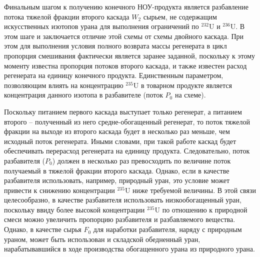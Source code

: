 Финальным шагом к получению конечного НОУ-продукта является разбавление потока тяжелой фракции второго каскада $W_2$ сырьем, не содержащим искусственных изотопов урана для выполнения ограничений по $^{232}$U и $^{236}$U. В этом шаге и заключается отличие этой схемы от схемы двойного каскада. При этом для выполнения условия полного возврата массы регенерата в цикл пропорция смешивания фактически является заранее заданной, поскольку к этому моменту известна пропорция потоков второго каскада, и также известен расход регенерата на единицу конечного продукта. Единственным параметром, позволяющим влиять на концентрацию $^{235}$U в товарном продукте является концентрация данного изотопа в разбавителе (поток $P_0$ на схеме).

Поскольку питанием первого каскада выступает только регенерат, а питанием второго -- полученный из него средне-обогащенный регенерат, то поток тяжелой фракции на выходе из второго каскада будет в несколько раз меньше, чем исходный поток регенерата. Иными словами, при такой работе каскад будет обеспечивать перерасход регенерата на единицу продукта. Следовательно, поток разбавителя ($P_{0}$) должен в несколько раз превосходить по величине поток получаемый в тяжелой фракции второго каскада. Однако, если в качестве разбавителя использовать, например, природный уран, это условие может привести к снижению концентрации $^{235}$U ниже требуемой величины. В этой связи целесообразно, в качестве разбавителя использовать низкообогащенный уран, поскольку ввиду более высокой концентрации $^{235}$U по отношению к природной смеси можно увеличить пропорцию разбавителя и разбавляемого вещества. Однако, в качестве сырья $F_0$ для наработки разбавителя, наряду с природным ураном, может быть использован и складской обедненный уран, нарабатывавшийся в ходе производства обогащенного урана из природного урана.

